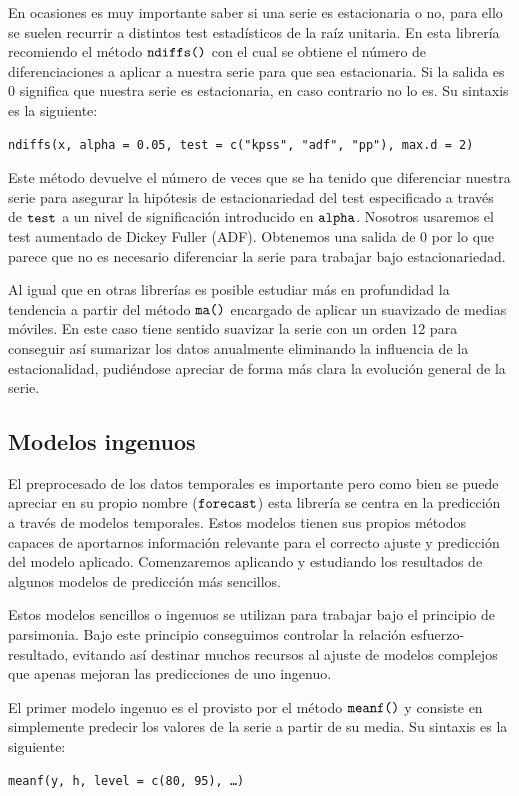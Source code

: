En ocasiones es muy importante saber si una serie es estacionaria o no, para ello se suelen recurrir a distintos test estadísticos de la raíz unitaria. En esta librería recomiendo el método $\verb!ndiffs()!$ con el cual se obtiene el número de diferenciaciones a aplicar a nuestra serie para que sea estacionaria. Si la salida es 0 significa que nuestra serie es estacionaria, en caso contrario no lo es. Su sintaxis es la siguiente:
\begin{Verbatim}[fontsize=\footnotesize]
ndiffs(x, alpha = 0.05, test = c("kpss", "adf", "pp"), max.d = 2)
\end{Verbatim}

Este método devuelve el número de veces que se ha tenido que diferenciar nuestra serie para asegurar la hipótesis de estacionariedad del test especificado a través de $\verb!test!$ a un nivel de significación introducido en $\verb!alpha!$. Nosotros usaremos el test aumentado de Dickey Fuller (ADF). Obtenemos una salida de 0 por lo que parece que no es necesario diferenciar la serie para trabajar bajo estacionariedad.

Al igual que en otras librerías es posible estudiar más en profundidad la tendencia a partir del método $\verb!ma()!$ encargado de aplicar un suavizado de medias móviles. En este caso tiene sentido suavizar la serie con un orden 12 para conseguir así sumarizar los datos anualmente eliminando la influencia de la estacionalidad, pudiéndose apreciar de forma más clara la evolución general de la serie.

\subsection{Modelos ingenuos}
El preprocesado de los datos temporales es importante pero como bien se puede apreciar en su propio nombre ($\verb!forecast!$) esta librería se centra en la predicción a través de modelos temporales. Estos modelos tienen sus propios métodos capaces de aportarnos información relevante para el correcto ajuste y predicción del modelo aplicado. Comenzaremos aplicando y estudiando los resultados de algunos modelos de predicción más sencillos.

Estos modelos sencillos o ingenuos se utilizan para trabajar bajo el principio de parsimonia. Bajo este principio conseguimos controlar la relación esfuerzo-resultado, evitando así destinar muchos recursos al ajuste de modelos complejos que apenas mejoran las predicciones de uno ingenuo.

El primer modelo ingenuo es el provisto por el método $\verb!meanf()!$ y consiste en simplemente predecir los valores de la serie a partir de su media. Su sintaxis es la siguiente:
\begin{Verbatim}[fontsize=\footnotesize]
meanf(y, h, level = c(80, 95), …)
\end{Verbatim}

